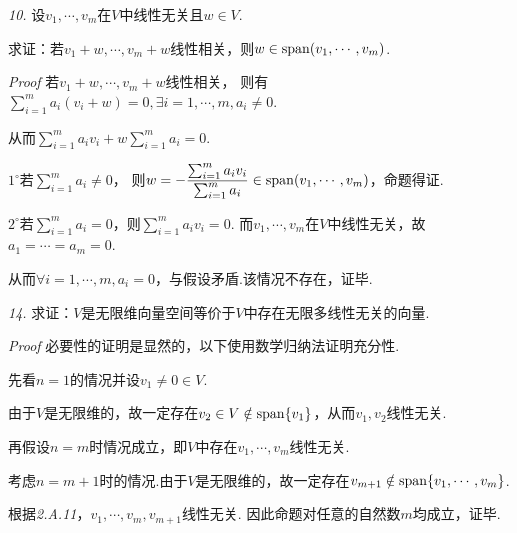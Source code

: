 \textit{10.}
设\(v_1,\cdots,v_m\)在\(V\)中线性无关且\(w\in V\).

求证：若\(v_1+w,\cdots,v_m+w\)线性相关，则\(w\in \mathrm{span} (v_1,\cdots,v_m)\).

\textit{Proof}
若\(v_1+w,\cdots,v_m+w\)线性相关，
则有\(\sum_{i=1}^m a_i(v_i+w)=0,\exists i=1,\cdots,m,a_i\ne 0\).

从而\(\sum_{i=1}^m a_iv_i+w\sum_{i=1}^m a_i=0\).

\(1^{\circ}\)若\(\sum_{i=1}^m a_i\ne 0\)，
则\(w=-\dfrac{\sum_{i=1}^m a_iv_i}{\sum_{i=1}^m a_i}\in \mathrm{span} (v_1,\cdots,v_m)\)，命题得证.

\(2^{\circ}\)若\(\sum_{i=1}^m a_i=0\)，则\(\sum_{i=1}^m a_iv_i=0\).
而\(v_1,\cdots,v_m\)在\(V\)中线性无关，故\(a_1=\cdots=a_m=0\).

从而\(\forall i=1,\cdots,m, a_i=0\)，与假设矛盾.该情况不存在，证毕.

\hspace*{\fill}

\textit{14.}
求证：\(V\)是无限维向量空间等价于\(V\)中存在无限多线性无关的向量.

\textit{Proof}
必要性的证明是显然的，以下使用数学归纳法证明充分性.

先看\(n=1\)的情况并设\(v_1 \ne 0 \in V\).

由于\(V\)是无限维的，故一定存在\(v_2 \in V \notin \mathrm{span} \{v_1\}\)，从而\(v_1,v_2\)线性无关.

再假设\(n=m\)时情况成立，即\(V\)中存在\(v_1,\cdots,v_m\)线性无关.

考虑\(n=m+1\)时的情况.由于\(V\)是无限维的，故一定存在\(v_{m+1} \notin \mathrm{span} \{v_1,\cdots,v_m\}\).

根据\textit{2.A.11}，\(v_1,\cdots,v_m,v_{m+1}\)线性无关.
因此命题对任意的自然数\(m\)均成立，证毕.

